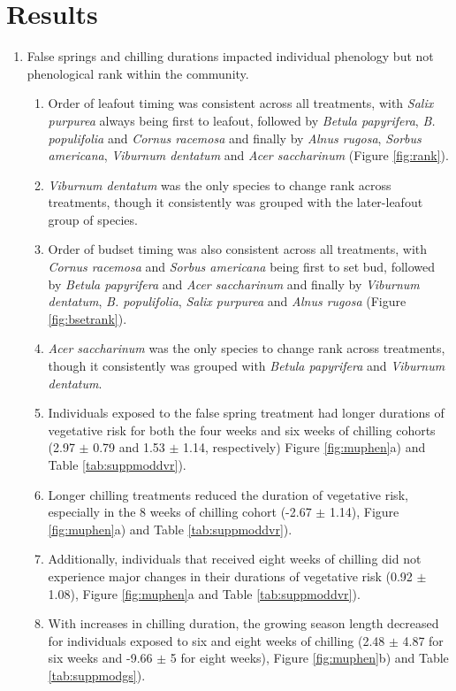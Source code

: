 \documentclass{article}\usepackage[]{graphicx}\usepackage[]{color}
\begin{document}
\section*{Results}
\begin{enumerate}
\item False springs and chilling durations impacted individual phenology but not phenological rank within the community. 
  \begin{enumerate}
  \item Order of leafout timing was consistent across all treatments, with \textit{Salix purpurea} always being first to leafout, followed by \textit{Betula papyrifera}, \textit{B. populifolia} and \textit{Cornus racemosa} and finally by \textit{Alnus rugosa}, \textit{Sorbus americana}, \textit{Viburnum dentatum} and \textit{Acer saccharinum} (Figure \ref{fig:rank}).
  \item \textit{Viburnum dentatum} was the only species to change rank across treatments, though it consistently was grouped with the later-leafout group of species.
  \item Order of budset timing was also consistent across all treatments, with \textit{Cornus racemosa} and \textit{Sorbus americana} being first to set bud, followed by \textit{Betula papyrifera} and \textit{Acer saccharinum} and finally by \textit{Viburnum dentatum}, \textit{B. populifolia}, \textit{Salix purpurea} and \textit{Alnus rugosa} (Figure \ref{fig:bsetrank}).
  \item \textit{Acer saccharinum} was the only species to change rank across treatments, though it consistently was grouped with \textit{Betula papyrifera} and \textit{Viburnum dentatum}.
  \item Individuals exposed to the false spring treatment had longer durations of vegetative risk for both the four weeks and six weeks of chilling cohorts (2.97 $\pm$ 0.79 and 1.53 $\pm$ 1.14, respectively) Figure \ref{fig:muphen}a) and Table \ref{tab:suppmoddvr}).
  \item Longer chilling treatments reduced the duration of vegetative risk, especially in the 8 weeks of chilling cohort (-2.67 $\pm$ 1.14), Figure \ref{fig:muphen}a) and Table \ref{tab:suppmoddvr}).
  \item Additionally, individuals that received eight weeks of chilling did not experience major changes in their durations of vegetative risk (0.92 $\pm$ 1.08), Figure \ref{fig:muphen}a and Table \ref{tab:suppmoddvr}). 
  \item With increases in chilling duration, the growing season length decreased for individuals exposed to six and eight weeks of chilling (2.48 $\pm$ 4.87 for six weeks and -9.66 $\pm$ 5 for eight weeks), Figure \ref{fig:muphen}b) and Table \ref{tab:suppmodgs}).
  \end{enumerate}
  

\end{enumerate}
\end{document}
